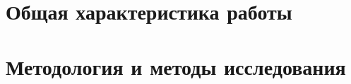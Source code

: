 \section*{Общая характеристика работы}
\newcommand{\actuality}{\pdfbookmark[1]{Актуальность и разработанность темы}{actuality}\underline{\textbf{\actualityTXT}}}
\newcommand{\aim}{\pdfbookmark[1]{Цели}{aim}\underline{{\textbf\aimTXT}}}
\newcommand{\tasks}{\pdfbookmark[1]{Задачи}{tasks}\underline{\textbf{\tasksTXT}}}
\newcommand{\aimtasks}{\pdfbookmark[1]{Цели и задачи}{aimtasks}\aimtasksTXT}
\newcommand{\novelty}{\pdfbookmark[1]{Научная новизна}{novelty}\underline{\textbf{\noveltyTXT}}}
\newcommand{\influence}{\pdfbookmark[1]{Практическая значимость}{influence}\underline{\textbf{\influenceTXT}}}
\newcommand{\defpositions}{\pdfbookmark[1]{Положения, выносимые на защиту}{defpositions}\underline{\textbf{\defpositionsTXT}}}
\newcommand{\reliability}{\pdfbookmark[1]{Достоверность}{reliability}\underline{\textbf{\reliabilityTXT}}}
\newcommand{\contribution}{\pdfbookmark[1]{Личный вклад}{contribution}\underline{\textbf{\contributionTXT}}}
\newcommand{\publications}{\pdfbookmark[1]{Публикации}{publications}\underline{\textbf{\publicationsTXT}}}







\section*{Методология и методы исследования}

